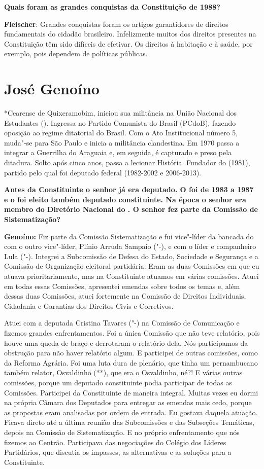 \textbf{Quais foram as grandes conquistas da Constituição de 1988?}

\textbf{Fleischer}: Grandes conquistas foram os artigos garantidores de
direitos fundamentais do cidadão brasileiro. Infelizmente muitos dos
direitos presentes na Constituição têm sido difíceis de efetivar. Os
direitos à habitação e à saúde, por exemplo, pois dependem de políticas
públicas.

\chapter{José Genoíno}

*Cearense de Quixeramobim, iniciou sua militância na União Nacional dos
Estudantes (). Ingressa no Partido Comunista do Brasil (PCdoB),
fazendo oposição ao regime ditatorial do Brasil. Com o Ato Institucional
número 5, muda"-se para São Paulo e inicia a militância clandestina. Em
1970 passa a integrar a Guerrilha do Araguaia e, em seguida, é capturado
e preso pela ditadura. Solto após cinco anos, passa a lecionar História.
Fundador do  (1981), partido pelo qual foi deputado federal (1982-2002
e 2006-2013).

\textbf{Antes da Constituinte o senhor já era deputado. O foi de 1983 a
1987 e o foi eleito também deputado constituinte. Na época o senhor era
membro do Diretório Nacional do . O senhor fez parte da Comissão de
Sistematização?}

\textbf{Genoíno:} Fiz parte da Comissão Sistematização e fui vice"-líder
da bancada do  com o outro vice"-líder, Plínio Arruda Sampaio ("-),
e com o líder e companheiro Lula ("-). Integrei a Subcomissão de
Defesa do Estado, Sociedade e Segurança e a Comissão de Organização
eleitoral partidária. Eram as duas Comissões em que eu atuava
prioritariamente, mas na Constituinte atuamos em várias comissões. Atuei
em todas essas Comissões, apresentei emendas sobre todos os temas e,
além dessas duas Comissões, atuei fortemente na Comissão de Direitos
Individuais, Cidadania e Garantias dos Direitos Civis e Corretivos.

Atuei com a deputada Cristina Tavares ("-) na Comissão de
Comunicação e fizemos grandes enfrentamentos. Foi a única Comissão que
não teve relatório, pois houve uma queda de braço e derrotaram o
relatório dela. Nós participamos da obstrução para não haver relatório
algum. E participei de outras comissões, como da Reforma Agrária. Foi
uma luta dura de plenário, que tinha um pernambucano também relator,
Osvaldinho (**), que era o Osvaldinho, né?! E várias outras comissões,
porque um deputado constituinte podia participar de todas as Comissões.
Participei da Constituinte de maneira integral. Muitas vezes eu dormi na
própria Câmara dos Deputados para entregar as emendas mais cedo, porque
as propostas eram analisadas por ordem de entrada. Eu gostava daquela
atuação. Ficava direto até a última reunião das Subcomissões e das
Subseções Temáticas, depois na Comissão de Sistematização. E no próprio
enfrentamento que nós fizemos ao Centrão. Participava das negociações do
Colégio dos Líderes Partidários, que discutia os impasses, as
alternativas e as soluções para a Constituinte.

